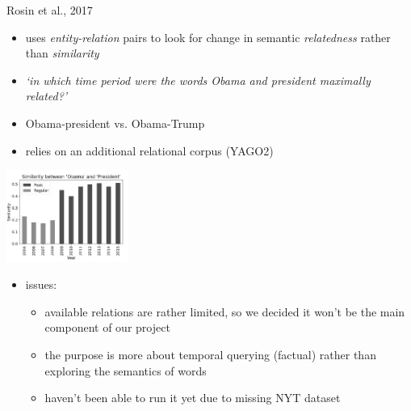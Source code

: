 \documentclass[10pt]{beamer}
\begin{document}
\begin{frame}{Rosin et al., 2017}
    \begin{itemize}
        \item uses \textit{entity-relation} pairs to look for change in semantic \textit{relatedness} rather than \textit{similarity}
    \end{itemize}
    \begin{minipage}{.60\textwidth}
    \begin{itemize}
        \begin{itemize}
            \item \textit{‘in which time period were the words Obama and president maximally related?’}
            \item Obama-president vs. Obama-Trump
            \item relies on an additional relational corpus (YAGO2)
        \end{itemize}
    \end{itemize}
    \end{minipage}
        \begin{minipage}{.30\textwidth}
        \includegraphics[width=4cm]{rosin_results.png}
    \end{minipage} 
    \begin{itemize}
        \item issues:
        \begin{itemize}
            \item available relations are rather limited, so we decided it won't be the main component of our project
            \item the purpose is more about temporal querying (factual) rather than exploring the semantics of words 
            \item haven't been able to run it yet due to missing NYT dataset
        \end{itemize}
    \end{itemize}   
\end{frame}
\end{document}
